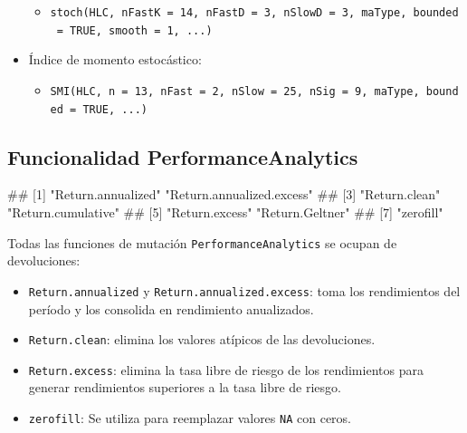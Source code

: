 \documentclass[
]{book}
\newenvironment{Shaded}{\begin{snugshade}}{\end{snugshade}}
\newcommand{\FunctionTok}[1]{\textcolor[rgb]{0.13,0.29,0.53}{\textbf{#1}}}
\newcommand{\NormalTok}[1]{#1}
\newcommand{\SpecialCharTok}[1]{\textcolor[rgb]{0.81,0.36,0.00}{\textbf{#1}}}
\providecommand{\tightlist}{%
  \setlength{\itemsep}{0pt}\setlength{\parskip}{0pt}}
\begin{document}
\begin{itemize}
  \begin{itemize}
  \tightlist
  \item
    \texttt{stoch(HLC,\ nFastK\ =\ 14,\ nFastD\ =\ 3,\ nSlowD\ =\ 3,\ maType,\ bounded\ =\ TRUE,\ smooth\ =\ 1,\ ...)}
  \end{itemize}
\item
  Índice de momento estocástico:

  \begin{itemize}
  \tightlist
  \item
    \texttt{SMI(HLC,\ n\ =\ 13,\ nFast\ =\ 2,\ nSlow\ =\ 25,\ nSig\ =\ 9,\ maType,\ bounded\ =\ TRUE,\ ...)}
  \end{itemize}
\end{itemize}

\hypertarget{funcionalidad-performanceanalytics}{%
\subsection{Funcionalidad PerformanceAnalytics}\label{funcionalidad-performanceanalytics}}

\begin{Shaded}
\end{Shaded}

\begin{Shaded}
\begin{Highlighting}[]
\NormalTok{\#\# [1] "Return.annualized"        "Return.annualized.excess"}
\NormalTok{\#\# [3] "Return.clean"             "Return.cumulative"       }
\NormalTok{\#\# [5] "Return.excess"            "Return.Geltner"          }
\NormalTok{\#\# [7] "zerofill"}
\end{Highlighting}
\end{Shaded}

Todas las funciones de mutación \texttt{PerformanceAnalytics} se ocupan de devoluciones:

\begin{itemize}
\item
  \texttt{Return.annualized} y \texttt{Return.annualized.excess}: toma los rendimientos del período y los consolida en rendimiento anualizados.
\item
  \texttt{Return.clean}: elimina los valores atípicos de las devoluciones.
\item
  \texttt{Return.excess}: elimina la tasa libre de riesgo de los rendimientos para generar rendimientos superiores a la tasa libre de riesgo.
\item
  \texttt{zerofill}: Se utiliza para reemplazar valores \texttt{NA} con ceros.
\end{itemize}
\end{document}
